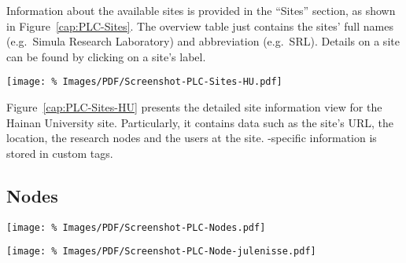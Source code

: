 Information about the available  sites is provided in the ``Sites'' section, as shown in Figure~\ref{cap:PLC-Sites}. The overview table just contains the sites' full names (e.g.\ Simula Research Laboratory) and abbreviation (e.g.\ SRL). Details on a site can be found by clicking on a site's label.

\begin{figure*}
\begin{center}
\texttt{[image: \%
   Images/PDF/Screenshot-PLC-Sites-HU.pdf]}
\end{center}
\caption{Sites $\rightarrow$ Hainan University~(HU)}
\label{cap:PLC-Sites-HU}
\end{figure*}

Figure~\ref{cap:PLC-Sites-HU} presents the detailed site information view for the Hainan University site. Particularly, it contains data such as the site's URL, the location, the research nodes and the users at the site. -specific information is stored in custom tags.


\subsection{Nodes}
\label{sub:Nodes}

\begin{figure*}
\begin{center}
\texttt{[image: \%
   Images/PDF/Screenshot-PLC-Nodes.pdf]}
\end{center}
\caption{Nodes}
\label{cap:PLC-Nodes}
\end{figure*}

\begin{figure*}
\begin{center}
\texttt{[image: \%
   Images/PDF/Screenshot-PLC-Node-julenisse.pdf]}
\end{center}
\caption{Nodes $\rightarrow$ Node julenisse.uia.nornet}
\label{cap:PLC-Node-Details}
\end{figure*}

